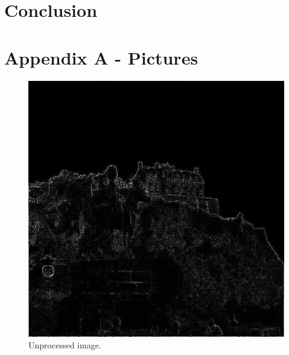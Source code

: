\documentclass[11pt]{article}
\begin{document}
	\section{Conclusion}


	\pagebreak
	\section{Appendix A - Pictures} \label{ap1}
	
	\begin{figure}[H]	
		\centering
		\includegraphics[scale=0.23]{edge768x768.jpg}
		\caption{Unprocessed image.}\label{pic0}
	\end{figure}
	
\end{document}
